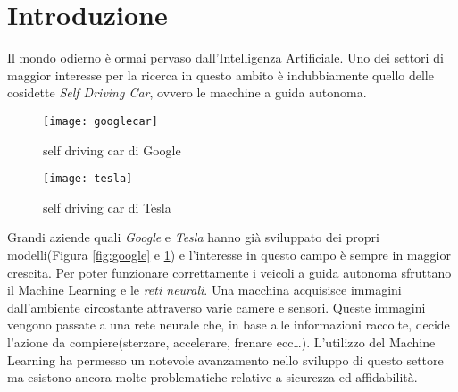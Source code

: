 \chapter*{Introduzione}
Il mondo odierno è ormai pervaso dall'Intelligenza Artificiale. Uno dei settori di maggior interesse per la
ricerca in questo ambito è indubbiamente quello delle cosidette \emph{Self Driving Car}, ovvero
le macchine a guida autonoma. 
\begin{figure}
  \centering
  \parbox{5cm}{
  \texttt{[image: googlecar]}
  \caption{self driving car di Google}
  \label{fig:google}}
  \qquad
  \begin{minipage}{5cm}
  \texttt{[image: tesla]}
  \caption{self driving car di Tesla}
  \label{fig:tesla}
  \end{minipage}
  \end{figure}
Grandi aziende quali \emph{Google} e \emph{Tesla} hanno già sviluppato
dei propri modelli(Figura \ref{fig:google} e \ref{fig:tesla}) e l'interesse in questo campo è sempre in  maggior crescita. Per poter funzionare correttamente  i veicoli a guida autonoma sfruttano il Machine Learning e le \emph{reti neurali}. Una macchina acquisisce immagini
dall'ambiente circostante attraverso varie camere e sensori. Queste immagini vengono passate a una rete neurale che, in base alle informazioni raccolte, decide l'azione da compiere(sterzare, accelerare, frenare ecc\dots).
L'utilizzo del Machine Learning ha permesso un notevole avanzamento nello sviluppo di questo settore ma  esistono ancora molte problematiche relative a sicurezza ed affidabilità.\\

